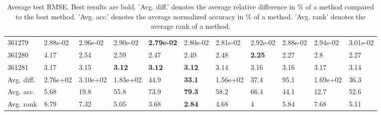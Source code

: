 \begin{table}[ht!]
\begin{tabular}{lllllllllll}
  361279 & 2.88e-02 & 2.96e-02 & 2.90e-02 & \textbf{2.79e-02} & 2.80e-02 & 2.81e-02 & 2.92e-02 & 2.88e-02 & 2.94e-02 & 3.01e-02 \\ 
  361280 & 4.17 & 2.54 & 2.59 & 2.47 & 2.49 & 2.48 & \textbf{2.25} & 2.27 & 2.8 & 2.27 \\ 
  361281 & 3.17 & 3.15 & \textbf{3.12} & \textbf{3.12} & \textbf{3.12} & 3.14 & 3.16 & 3.16 & 3.17 & 3.14 \\ 
   \hline
Avg. diff. & 2.76e+02 & 3.10e+02 & 1.83e+02 & 44.9 & \textbf{33.1} & 1.56e+02 & 37.4 & 95.1 & 1.69e+02 & 36.3 \\ 
  Avg. acc. & 5.68 & 19.8 & 55.8 & 73.9 & \textbf{79.3} & 58.2 & 66.4 & 44.1 & 12.7 & 52.6 \\ 
  Avg. rank & 8.79 & 7.32 & 5.05 & 3.68 & \textbf{2.84} & 4.68 & 4 & 5.84 & 7.68 & 5.11 \\ 
   \hline
\hline
\end{tabular}
\endgroup
\caption{Average test RMSE. 
                  Best results are bold. 
                  'Avg. diff.' denotes the average relative difference in \% of a method compared to the best method.
                  'Avg. acc.' denotes the average normalized accuracy in \% of a method.
                  'Avg. rank' denotes the average rank of a method.} 
\label{TABLES/table_results_RMSE_clustering}
\end{table}
